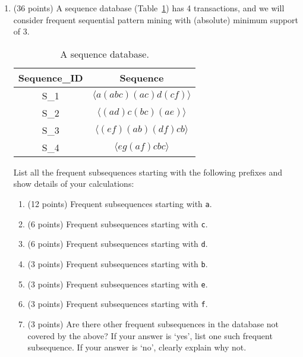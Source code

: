 \documentclass[11pt]{article}
\begin{document}
\begin{enumerate}
\item (36 points) A sequence database (Table~\ref{tab:sdb1}) has 4 transactions, and we will consider frequent sequential pattern mining with (absolute) minimum support of 3.
\begin{table}[h]
\begin{center}
\begin{tabular}{|c||c|} \hline
Sequence\_ID & Sequence \\ \hline \hline
S_1 & $\langle a(abc)(ac)d(cf) \rangle$ \\
S_2 & $\langle (ad)c(bc)(ae) \rangle$ \\ 
S_3 & $\langle (ef)(ab)(df)cb\rangle$ \\
S_4 & $\langle eg(af)cbc \rangle$   \\ \hline
\end{tabular}
\end{center}
\caption{A sequence database.}
\label{tab:sdb1}
\end{table}
List all the frequent subsequences starting with the following prefixes and show details of your calculations:
\begin{enumerate}
\item (12 points) Frequent subsequences starting with {\tt a}.
\item (6 points) Frequent subsequences starting with {\tt c}.
\item (6 points) Frequent subsequences starting with {\tt d}.
\item (3 points) Frequent subsequences starting with {\tt b}.
\item (3 points) Frequent subsequences starting with {\tt e}.
\item (3 points) Frequent subsequences starting with {\tt f}.
\item (3 points) Are there other frequent subsequences in the database not covered by the above? If your answer is `yes', list one such frequent subsequence. If your answer is `no', clearly explain why not.
\end{enumerate}



\end{enumerate}
\end{document}
